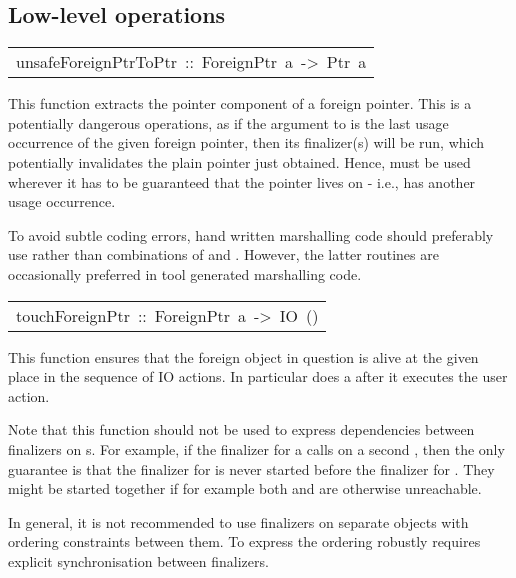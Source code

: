 \subsection{Low-level operations
}
\begin{haddockdesc}
\item[\begin{tabular}{@{}l}
unsafeForeignPtrToPtr\ ::\ ForeignPtr\ a\ ->\ Ptr\ a
\end{tabular}]\haddockbegindoc
This function extracts the pointer component of a foreign
 pointer.  This is a potentially dangerous operations, as if the
 argument to  is the last usage
 occurrence of the given foreign pointer, then its finalizer(s) will
 be run, which potentially invalidates the plain pointer just
 obtained.  Hence,  must be used
 wherever it has to be guaranteed that the pointer lives on - i.e.,
 has another usage occurrence.
\par
To avoid subtle coding errors, hand written marshalling code
 should preferably use  rather
 than combinations of  and
 .  However, the latter routines
 are occasionally preferred in tool generated marshalling code.
\par

\end{haddockdesc}
\begin{haddockdesc}
\item[\begin{tabular}{@{}l}
touchForeignPtr\ ::\ ForeignPtr\ a\ ->\ IO\ ()
\end{tabular}]\haddockbegindoc
This function ensures that the foreign object in
 question is alive at the given place in the sequence of IO
 actions. In particular 
 does a  after it
 executes the user action.
\par
Note that this function should not be used to express dependencies
 between finalizers on s.  For example, if the finalizer
 for a   calls  on a second
  , then the only guarantee is that the finalizer
 for  is never started before the finalizer for .  They
 might be started together if for example both  and  are
 otherwise unreachable.
\par
In general, it is not recommended to use finalizers on separate
 objects with ordering constraints between them.  To express the
 ordering robustly requires explicit synchronisation between
 finalizers.
\par

\end{haddockdesc}
